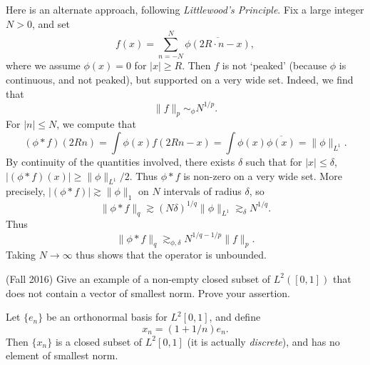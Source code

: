 \documentclass[answers]{exam}
\begin{document}
\begin{questions}
\begin{parts}
\begin{solution}
  Here is an alternate approach, following \emph{Littlewood's Principle}. Fix a large integer $N > 0$, and set
  \[ f(x) = \sum_{n = -N}^N \overline{\phi(2R \cdot n-x)}, \]
  where we assume $\phi(x) = 0$ for $|x| \geq R$.  Then $f$ is not `peaked' (because $\phi$ is continuous, and not peaked), but supported on a very wide set. Indeed, we find that
  \[ \| f \|_p \sim_\phi N^{1/p}. \]
  For $|n| \leq N$, we compute that
  \[ (\phi * f)(2Rn) = \int \phi(x) f(2Rn - x) = \int \phi(x) \overline{\phi(x)} = \| \phi \|_{L^1}. \]
  By continuity of the quantities involved, there exists $\delta$ such that for $|x| \leq \delta$, $|(\phi * f)(x)| \geq \| \phi \|_{L^1} / 2$. Thus $\phi * f$ is non-zero on  a very wide set. More precisely, $|(\phi * f)| \gtrsim \| \phi \|_1$ on $N$ intervals of radius $\delta$, so
  \[ \| \phi * f \|_q \gtrsim (N \delta)^{1/q} \| \phi \|_{L^1} \gtrsim_\delta N^{1/q}. \]
  Thus
  \[ \| \phi * f \|_q \gtrsim_{\phi,\delta} N^{1/q - 1/p} \| f \|_p. \]
  Taking $N \to \infty$ thus shows that the operator is unbounded.
\end{solution}
\end{parts}


\item (Fall 2016)
  Give an example of a non-empty closed subset of $L^{2}([0,1])$ that does not contain a vector of smallest norm. Prove your assertion.

\begin{solution}
	Let $\{ e_n \}$ be an orthonormal basis for $L^2[0,1]$, and define
	\[ x_n = (1 + 1/n) e_n. \]
	Then $\{ x_n \}$ is a closed subset of $L^2[0,1]$ (it is actually \emph{discrete}), and has no element of smallest norm.

\begin{comment}
  Let $e_{n} = \sqrt{2}\sin(n\pi x)$ for $n=1,2,\ldots$, and define $x_{n}= \left(\frac{n+1}{n}\right)e_{n}$. Then $\{x_{n}\}_{n=1}$ is a nonempty closed subset with no element of smallest norm. To prove this, we first prove two claims:

  

 
  \noindent \textit{Claim 1:} $\{e_{n}\}_{n\geq 1}$ is an orthonormal set in $L^{2}([0,1])$.
  \begin{proof}[Proof of Claim 1:]
    Need to show two things: (1) that $\norm{e_{n}}_{L^{2}([0,1])}=1$ for all $n$, and (2) that $\langle e_{n},e_{m}\rangle$ whenever $m\neq n$. These can be shown by direct computation using trig identities:

    Suppose $n\geq 1$. Then using $\sin^{2}(\theta) = \frac{1}{2}\left( 1-\cos(2\theta) \right)$,


\end{comment}
\end{solution}
\end{questions}
\end{document}
